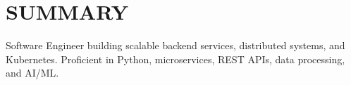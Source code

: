 % 
\vspace{2pt}
\section{\large \textbf{SUMMARY}}
Software Engineer building scalable backend services, distributed systems, and Kubernetes. Proficient in Python, microservices, REST APIs, data processing, and AI/ML.
